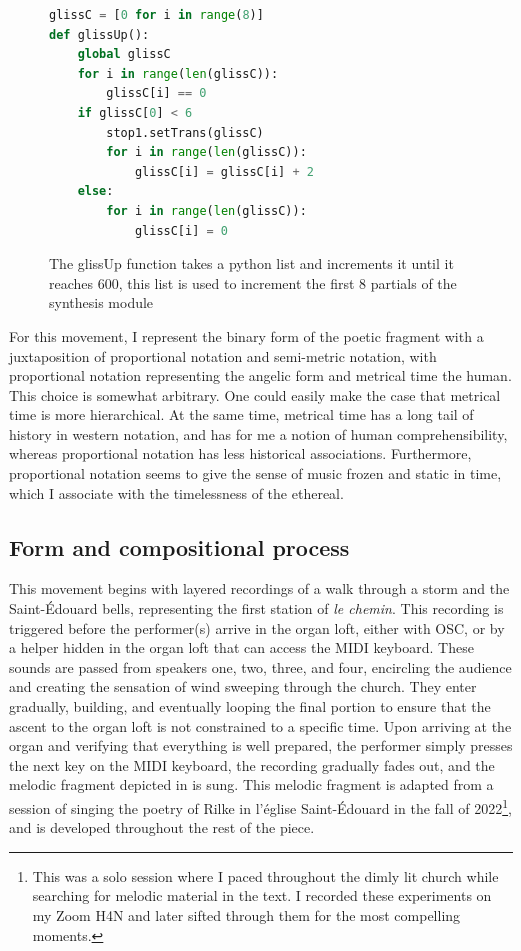 \documentclass[12pt,twoside,maitrise]{dms_ks}
\theoremstyle{definition}
\begin{document}
{%

\begin{figure}[H]
\begin{lstlisting}[language=Python]
glissC = [0 for i in range(8)]
def glissUp():
    global glissC
    for i in range(len(glissC)):
        glissC[i] == 0
    if glissC[0] < 6
        stop1.setTrans(glissC)
        for i in range(len(glissC)):
            glissC[i] = glissC[i] + 2
    else:
        for i in range(len(glissC)):
            glissC[i] = 0
\end{lstlisting}
\caption{The glissUp function takes a python list and increments it until it reaches 600, this list is used to increment the first 8 partials of the synthesis module}
\label{fig:glissup}
\end{figure}

For this movement, I represent the binary form of the poetic fragment with a juxtaposition of proportional notation and semi-metric notation, with proportional notation representing the angelic form and metrical time the human.
This choice is somewhat arbitrary.
One could easily make the case that metrical time is more hierarchical.
At the same time, metrical time has a long tail of history in western notation, and has for me a notion of human comprehensibility, whereas proportional notation has less historical associations.
Furthermore, proportional notation seems to give the sense of music frozen and static in time, which I associate with the timelessness of the ethereal.

\subsection{Form and compositional process}

This movement begins with layered recordings of a walk through a storm and the Saint-Édouard bells, representing the first station of \textit{le chemin}.
This recording is triggered before the performer(s) arrive in the organ loft, either with OSC, or by a helper hidden in the organ loft that can access the MIDI keyboard.  
These sounds are passed from speakers one, two, three, and four, encircling the audience and creating the sensation of wind sweeping through the church. 
They enter gradually, building, and eventually looping the final portion to ensure that the ascent to the organ loft is not constrained to a specific time. 
Upon arriving at the organ and verifying that everything is well prepared, the performer simply presses the next key on the MIDI keyboard, the recording gradually fades out, and the melodic fragment depicted in  is sung.
This melodic fragment is adapted from a session of singing the poetry of Rilke in l'église Saint-Édouard in the fall of 2022\footnote{This was a solo session where I paced throughout the dimly lit church while searching for melodic material in the text. I recorded these experiments on my Zoom H4N and later sifted through them for the most compelling moments.}, and is developed throughout the rest of the piece.

}
\end{document}

